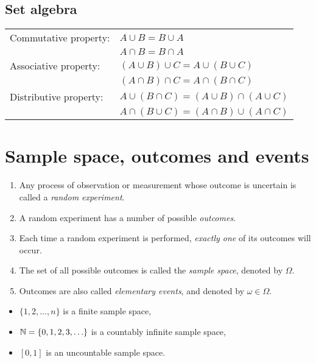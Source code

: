 \subsection{Set algebra}
\begin{tabular}{ll}
Commutative property:  	& $A\cup B = B\cup A$ \\
						& $A\cap B = B\cap A$ \\[2ex]
Associative property:	& $(A\cup B)\cup C = A\cup (B\cup C)$ \\
						& $(A\cap B)\cap C = A\cap (B\cap C)$ \\[2ex] 
Distributive property:	& $A\cup (B\cap C) = (A\cup B)\cap(A\cup C)$ \\
						& $A\cap (B\cup C) = (A\cap B)\cup(A\cap C)$ \\
\end{tabular}

\section{Sample space, outcomes and events}

\begin{definition}
\begin{enumerate}
\item Any process of observation or measurement whose outcome is uncertain is called a \emph{random experiment}.
\item A random experiment has a number of possible \emph{outcomes}. 
\item Each time a random experiment is performed, \emph{exactly one} of its outcomes will occur.
\item The set of all possible outcomes is called the \emph{sample space}, denoted by $\Omega$.
\item Outcomes are also called \emph{elementary events}, and denoted by $\omega\in\Omega$.
\end{enumerate}
\end{definition}

\begin{example}
\begin{itemize}
\item $\{1,2,\ldots,n\}$ is a finite sample space,
\item $\mathbb{N}=\{0,1,2,3,\ldots\}$ is a countably infinite sample space,
\item $[0,1]$ is an uncountable sample space.
\end{itemize}
\end{example}

